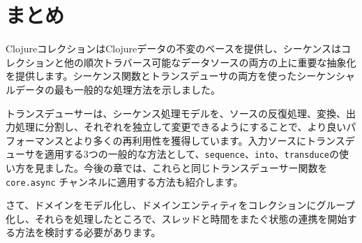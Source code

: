\section{まとめ}

ClojureコレクションはClojureデータの不変のベースを提供し、シーケンスはコレクションと他の順次トラバース可能なデータソースの両方の上に重要な抽象化を提供します。シーケンス関数とトランスデューサの両方を使ったシーケンシャルデータの最も一般的な処理方法を示しました。

トランスデューサーは、シーケンス処理モデルを、ソースの反復処理、変換、出力処理に分割し、それぞれを独立して変更できるようにすることで、より良いパフォーマンスとより多くの再利用性を獲得しています。入力ソースにトランスデューサを適用する3つの一般的な方法として、\texttt{sequence}、\texttt{into}、\texttt{transduce}の使い方を見ました。今後の章では、これらと同じトランスデューサー関数を \texttt{core.async} チャンネルに適用する方法も紹介します。

さて、ドメインをモデル化し、ドメインエンティティをコレクションにグループ化し、それらを処理したところで、スレッドと時間をまたぐ状態の連携を開始する方法を検討する必要があります。